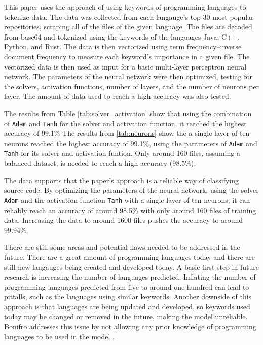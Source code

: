\documentclass[acmlarge]{acmart}
\begin{document}
This paper uses the approach of using keywords of programming languages to tokenize data. The data was
collected from each langauge's top 30 most popular repositories, scraping all of the files of the given
language. The files are decoded from base64 and tokenized using the keywords of the languages Java, C++,
Python, and Rust. The data is then vectorized using term frequency–inverse document frequency to measure
each keyword's importance in a given file. The vectorized data is then used as input for a basic multi-layer
perceptron neural network. The parameters of the neural network were then optimized, testing for the solvers,
activation functions, number of layers, and the number of neurons per layer. The amount of data used to reach
a high accuracy was also tested.

The results from Table \ref{tab:solver_activation} show that using the combination of \verb|Adam| and \verb|Tanh|
for the solver and activation function, it reached the highest accuracy of 99.1\% The results from \ref{tab:neurons}
show the a single layer of ten neurons reached the highest accuracy of 99.1\%, using the parameters of \verb|Adam|
and \verb|Tanh| for its solver and activation funtion. Only around 160 files, assuming a balanced dataset, is
needed to reach a high accuracy (98.5\%).

The data supports that the paper's approach is a reliable way of classifying source code. By optimizing the
parameters of the neural network, using the solver \verb|Adam| and the activation function \verb|Tanh| with
a single layer of ten neurons, it can reliably reach an accuracy of around 98.5\% with only around 160 files
of training data. Increasing the data to around 1600 files pushes the accuracy to around 99.94\%.

There are still some areas and potential flaws needed to be addressed in the future. There are a great amount
of programming languages today and there are still new langauges being created and developed today. A basic
first step in future research is increasing the number of languages predicted. Inflating the number of
programming languages predicted from five to around one hundred can lead to pitfalls, such as the languages
using similar keywords. Another downside of this approach is that languages are being updated and developed,
so keywords used today may be changed or removed in the future, making the model unreliable. Bonifro addresses
this issue by not allowing any prior knowledge of programming languages to be used in the model \cite{BonifroStefano2021}.



\end{document}

